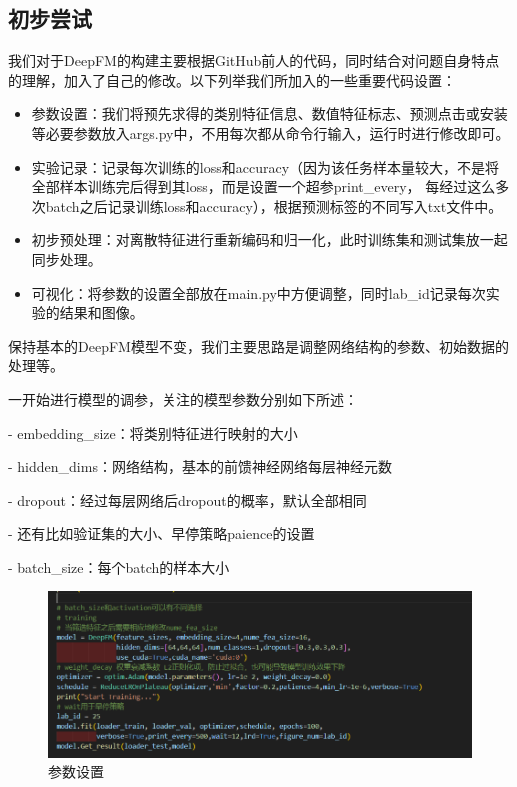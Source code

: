 \documentclass{article}
\begin{document}
\subsection{初步尝试}

我们对于DeepFM的构建主要根据GitHub前人的代码，同时结合对问题自身特点的理解，加入了自己的修改。以下列举我们所加入的一些重要代码设置：

\begin{itemize}
  \item 参数设置：我们将预先求得的类别特征信息、数值特征标志、预测点击或安装等必要参数放入args.py中，不用每次都从命令行输入，运行时进行修改即可。
  \item 实验记录：记录每次训练的loss和accuracy（因为该任务样本量较大，不是将全部样本训练完后得到其loss，而是设置一个超参print\_every，
  每经过这么多次batch之后记录训练loss和accuracy），根据预测标签的不同写入txt文件中。
  \item 初步预处理：对离散特征进行重新编码和归一化，此时训练集和测试集放一起同步处理。
  \item 可视化：将参数的设置全部放在main.py中方便调整，同时lab\_id记录每次实验的结果和图像。
\end{itemize}

保持基本的DeepFM模型不变，我们主要思路是调整网络结构的参数、初始数据的处理等。

一开始进行模型的调参，关注的模型参数分别如下所述：

- embedding\_size：将类别特征进行映射的大小

- hidden\_dims：网络结构，基本的前馈神经网络每层神经元数

- dropout：经过每层网络后dropout的概率，默认全部相同

- 还有比如验证集的大小、早停策略paience的设置

- batch\_size：每个batch的样本大小

\begin{figure}[htbp]
  \centering
  \includegraphics[scale=0.3]{arg1.png}
  \caption{参数设置}
  \label{figure8}
\end{figure}
\end{document}
